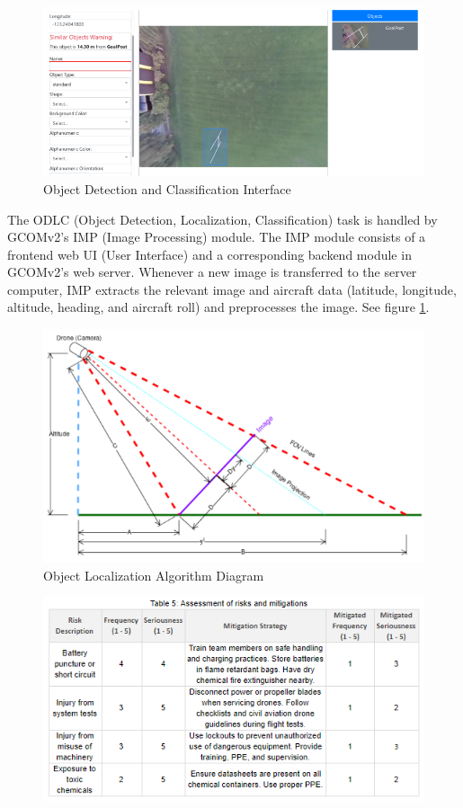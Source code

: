 \begin{figure}[H]\centering
\includegraphics[width=\linewidth]{figures/ODLC1}
\caption{Object Detection and Classification Interface}
\label{fig:ODLC1}
\end{figure}

The ODLC (Object Detection, Localization, Classification) task is handled by GCOMv2’s IMP (Image Processing) module. The IMP module consists of a frontend web UI (User Interface) and a corresponding backend module in GCOMv2’s web server. Whenever a new image is transferred to the server computer, IMP extracts the relevant image and aircraft data (latitude, longitude, altitude, heading, and aircraft roll) and preprocesses the image. See figure \ref{fig:ODLC1}.

\begin{figure}[H]\centering
\includegraphics[width=\linewidth]{figures/ODLC2}
\caption{Object Localization Algorithm Diagram}
\label{fig:ODLC2}
\end{figure}

\onecolumn

\begin{figure}[h]\centering
\includegraphics[width=0.75\linewidth]{table/Table_5_Assessment_of_risks_and_mitigations.PNG}
\caption*{}
\label{fig:Table_5_Assessment_of_risks_and_mitigations}
\end{figure}

